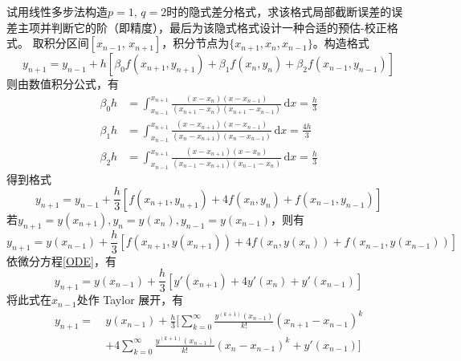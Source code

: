 \documentclass[11pt]{article}
\begin{document}
\begin{question}
    \questiontext
    {
        试用线性多步法构造$p = 1,\, q = 2$时的隐式差分格式，求该格式局部截断误差的误差主项并判断它的阶（即精度），最后为该隐式格式设计一种合适的预估-校正格式。
    }
    \answer
    {
        取积分区间$[x_{n - 1},\, x_{n + 1}]$，积分节点为$\{x_{n + 1}, x_{n}, x_{n - 1}\}$。构造格式
        \begin{equation*}
            y_{n + 1} = y_{n - 1} + h\left[\beta_0 f(x_{n + 1}, y_{n + 1}) + \beta_1 f(x_{n}, y_{n}) + \beta_2 f(x_{n - 1}, y_{n - 1})\right]
        \end{equation*}
        则由数值积分公式，有
        \begin{align*}
            \beta_0 h & = \int_{x_{n - 1}}^{x_{n + 1}}\!\frac{(x - x_{n})(x - x_{n - 1})}{(x_{n + 1} - x_{n})(x_{n + 1} - x_{n - 1})}\,\text{d}x = \frac{h}{3}  \\
            \beta_1 h & = \int_{x_{n - 1}}^{x_{n + 1}}\!\frac{(x - x_{n + 1})(x - x_{n - 1})}{(x_{n} - x_{n + 1})(x_{n} - x_{n - 1})}\,\text{d}x = \frac{4h}{3} \\
            \beta_2 h & = \int_{x_{n - 1}}^{x_{n + 1}}\!\frac{(x - x_{n + 1})(x - x_{n})}{(x_{n - 1} - x_{n + 1})(x_{n - 1} - x_{n})}\,\text{d}x = \frac{h}{3}
        \end{align*}
        得到格式
        \begin{equation*}
            y_{n + 1} = y_{n - 1} + \frac{h}{3}\left[f(x_{n + 1}, y_{n + 1}) + 4f(x_{n}, y_{n}) + f(x_{n - 1}, y_{n - 1})\right]
        \end{equation*}
        若$y_{n + 1} = y(x_{n + 1}), y_{n} = y(x_{n}), y_{n - 1} = y(x_{n - 1})$，则有
        \begin{equation*}
            y_{n + 1} = y(x_{n - 1}) + \frac{h}{3}\left[f(x_{n + 1}, y(x_{n + 1})) + 4f(x_{n}, y(x_{n    })) + f(x_{n - 1}, y(x_{n - 1}))\right]
        \end{equation*}
        依微分方程\eqref{ODE}，有
        \begin{equation*}
            y_{n + 1} = y(x_{n - 1}) + \frac{h}{3}\left[y'(x_{n + 1}) + 4y'(x_{n    }) + y'(x_{n - 1})\right]
        \end{equation*}
        将此式在$x_{n - 1}$处作 Taylor 展开，有
        \begin{align*}
            y_{n + 1} =\  & y(x_{n - 1}) + \frac{h}{3}\Bigg[\sum_{k = 0}^{\infty}\frac{y^{(k + 1)}(x_{n - 1})}{k!}(x_{n + 1} - x_{n - 1})^k                  \\
                          & + 4\sum_{k = 0}^{\infty}\frac{y^{(k + 1)}(x_{n - 1})}{k!}(x_{n    } - x_{n - 1})^k + y'(x_{n - 1})\Bigg]                         \\

\end{align*}}
\end{question}
\end{document}

